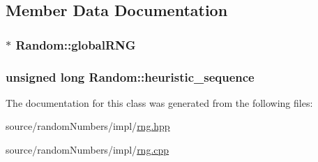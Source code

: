 \subsection{Member Data Documentation}
\hypertarget{classRandom_a6d4b3eed1223426d6267808c6111b1f}{
\subsubsection[{globalRNG}]{ $\ast$ {\bf Random::globalRNG}}}
\label{classRandom_a6d4b3eed1223426d6267808c6111b1f}


\hypertarget{classRandom_b24de55aa07bfe9c066f5651e29f2b73}{
\subsubsection[{heuristic\_\-sequence}]{\setlength{\rightskip}{0pt plus 5cm}unsigned long {\bf Random::heuristic\_\-sequence}}}
\label{classRandom_b24de55aa07bfe9c066f5651e29f2b73}




The documentation for this class was generated from the following files:\begin{CompactItemize}
\item 
source/randomNumbers/impl/\hyperlink{rng_8hpp}{rng.hpp}\item 
source/randomNumbers/impl/\hyperlink{rng_8cpp}{rng.cpp}\end{CompactItemize}
